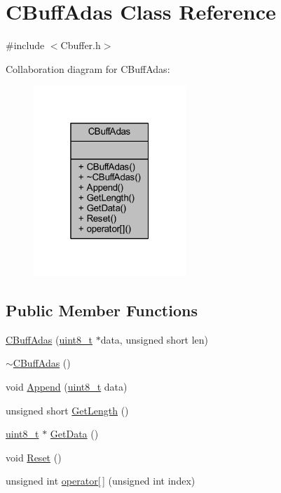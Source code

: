 \hypertarget{class_c_buff_adas}{}\section{C\+Buff\+Adas Class Reference}
\label{class_c_buff_adas}


{\ttfamily \#include $<$Cbuffer.\+h$>$}



Collaboration diagram for C\+Buff\+Adas\+:\nopagebreak
\begin{figure}[H]
\begin{center}
\leavevmode
\includegraphics[width=163pt]{class_c_buff_adas__coll__graph}
\end{center}
\end{figure}
\subsection*{Public Member Functions}
\begin{DoxyCompactItemize}
\item 
\mbox{\hyperlink{class_c_buff_adas_afb14758fc413199161d48963a83edadb}{C\+Buff\+Adas}} (\mbox{\hyperlink{_a_d_a_s___types_8h_aba7bc1797add20fe3efdf37ced1182c5}{uint8\+\_\+t}} $\ast$data, unsigned short len)
\item 
\mbox{\hyperlink{class_c_buff_adas_a55af513577ba8522492fff4db85da247}{$\sim$\+C\+Buff\+Adas}} ()
\item 
void \mbox{\hyperlink{class_c_buff_adas_ad131824caddc2ee1b90a629e4c30f215}{Append}} (\mbox{\hyperlink{_a_d_a_s___types_8h_aba7bc1797add20fe3efdf37ced1182c5}{uint8\+\_\+t}} data)
\item 
unsigned short \mbox{\hyperlink{class_c_buff_adas_aa17f6536175e0aafe8ab7b307decf279}{Get\+Length}} ()
\item 
\mbox{\hyperlink{_a_d_a_s___types_8h_aba7bc1797add20fe3efdf37ced1182c5}{uint8\+\_\+t}} $\ast$ \mbox{\hyperlink{class_c_buff_adas_a56fdcdc9766874d3a6fef04119ee91f9}{Get\+Data}} ()
\item 
void \mbox{\hyperlink{class_c_buff_adas_a2ff1ee5f1dfa56117d76b17027d7b7e8}{Reset}} ()
\item 
unsigned int \mbox{\hyperlink{class_c_buff_adas_aedceb4a4bcc47b6e4150a821f0494862}{operator\mbox{[}$\,$\mbox{]}}} (unsigned int index)
\end{DoxyCompactItemize}


